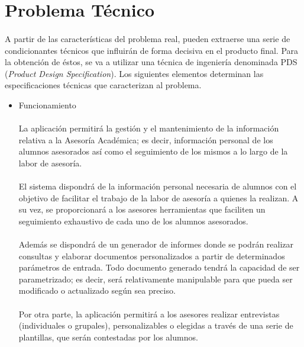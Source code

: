 \section{Problema Técnico}

\paragraph{}A partir de las características del problema real, pueden extraerse
una serie de condicionantes técnicos que influirán de forma decisiva en el
producto final. Para la obtención de éstos, se va a utilizar una técnica de
ingeniería denominada PDS (\textit{Product Design Specification}). Los
siguientes elementos determinan las especificaciones técnicas que caracterizan
al problema.

\begin{itemize}
 \item Funcionamiento

   \paragraph{}La aplicación permitirá la gestión y el mantenimiento de la
   información relativa a la Asesoría Académica; es decir, información personal
   de los alumnos asesorados así como el seguimiento de los mismos a lo largo
   de la labor de asesoría.

   \paragraph{}El sistema dispondrá de la información personal necesaria de
   alumnos con el objetivo de facilitar el trabajo de la labor de asesoría a
   quienes la realizan. A su vez, se proporcionará a los asesores herramientas
   que faciliten un seguimiento exhaustivo de cada uno de los alumnos
   asesorados.

   \paragraph{}Además se dispondrá de un generador de informes donde se podrán
   realizar consultas y elaborar documentos personalizados a partir de
   determinados parámetros de entrada. Todo documento generado tendrá la
   capacidad de ser parametrizado; es decir, será relativamente manipulable
   para que pueda ser modificado o actualizado según sea preciso.

   \paragraph{}Por otra parte, la aplicación permitirá a los asesores
   realizar entrevistas (individuales o grupales), personalizables o elegidas a
   través de una serie de plantillas, que serán contestadas por los alumnos.


\end{itemize}
